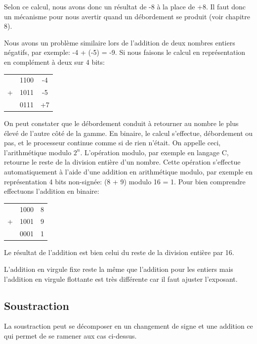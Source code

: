 Selon ce calcul, nous avons donc un résultat de -8 à la place de +8. Il faut donc un mécanisme pour nous avertir quand un débordement se produit (voir chapitre 8).

Nous avons un problème similaire lors de l'addition de deux nombres entiers négatifs, par exemple: -4 + (-5) = -9. Si nous faisons le calcul en représentation en complément à deux sur 4 bits:

\begin{center}
{\selectfont
\begin{tabular}{c c c}
  & 1100 & -4 \\
+ & 1011 & -5 \\
\hline
  & 0111 & +7 \\
\end{tabular}
}
\end{center}

On peut constater que le débordement conduit à retourner au nombre le plus élevé de l'autre côté de la gamme. En binaire, le calcul s'effectue, débordement ou pas, et le processeur continue comme si de rien n'était. On appelle ceci, l'arithmétique modulo $2^n$. L'opération modulo, par exemple en langage C, retourne le reste de la division entière d'un nombre. Cette opération s'effectue automatiquement à l'aide d'une addition en arithmétique modulo, par exemple en représentation 4 bits non-signée: (8 + 9) modulo 16 = 1. Pour bien comprendre effectuons l'addition en binaire:
 
\begin{center}
{\selectfont
\begin{tabular}{c c c}
  & 1000 & 8 \\
+ & 1001 & 9 \\
\hline
  & 0001 & 1 \\
\end{tabular}
}
\end{center}

Le résultat de l'addition est bien celui du reste de la division entière par 16.

L'addition en virgule fixe reste la même que l'addition pour les entiers mais l'addition en virgule flottante est très différente car il faut ajuster l'exposant.

\subsection{Soustraction}
La soustraction peut se décomposer en un changement de signe et une addition ce qui permet de se ramener aux cas ci-dessus. 

